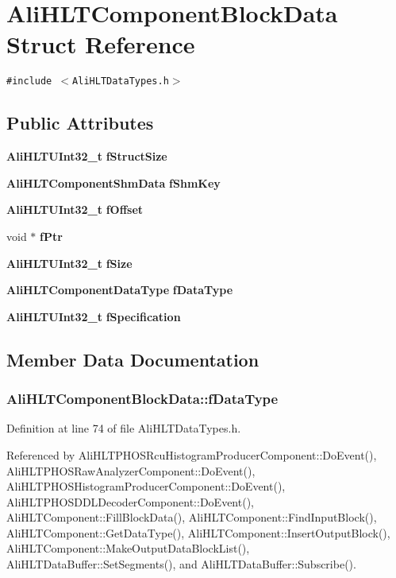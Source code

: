 \section{Ali\-HLTComponent\-Block\-Data Struct Reference}
\label{structAliHLTComponentBlockData}
{\tt \#include $<$Ali\-HLTData\-Types.h$>$}

\subsection*{Public Attributes}
\begin{CompactItemize}
\item 
{\bf Ali\-HLTUInt32\_\-t} {\bf f\-Struct\-Size}
\item 
{\bf Ali\-HLTComponent\-Shm\-Data} {\bf f\-Shm\-Key}
\item 
{\bf Ali\-HLTUInt32\_\-t} {\bf f\-Offset}
\item 
void $\ast$ {\bf f\-Ptr}
\item 
{\bf Ali\-HLTUInt32\_\-t} {\bf f\-Size}
\item 
{\bf Ali\-HLTComponent\-Data\-Type} {\bf f\-Data\-Type}
\item 
{\bf Ali\-HLTUInt32\_\-t} {\bf f\-Specification}
\end{CompactItemize}


\subsection{Member Data Documentation}
\subsubsection{ {\bf Ali\-HLTComponent\-Block\-Data::f\-Data\-Type}}\label{structAliHLTComponentBlockData_o5}




Definition at line 74 of file Ali\-HLTData\-Types.h.

Referenced by Ali\-HLTPHOSRcu\-Histogram\-Producer\-Component::Do\-Event(), Ali\-HLTPHOSRaw\-Analyzer\-Component::Do\-Event(), Ali\-HLTPHOSHistogram\-Producer\-Component::Do\-Event(), Ali\-HLTPHOSDDLDecoder\-Component::Do\-Event(), Ali\-HLTComponent::Fill\-Block\-Data(), Ali\-HLTComponent::Find\-Input\-Block(), Ali\-HLTComponent::Get\-Data\-Type(), Ali\-HLTComponent::Insert\-Output\-Block(), Ali\-HLTComponent::Make\-Output\-Data\-Block\-List(), Ali\-HLTData\-Buffer::Set\-Segments(), and Ali\-HLTData\-Buffer::Subscribe().

